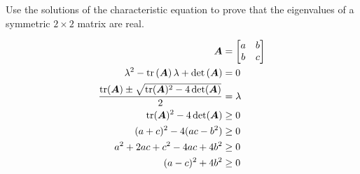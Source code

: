 Use the solutions of the characteristic equation to prove that the eigenvalues of a symmetric $2 \times 2$ matrix are real.

\begin{solution}
    \begin{align*}
        \boldsymbol{A} &= \begin{bmatrix}
            a & b \\
            b & c
        \end{bmatrix} \\
        \lambda^2 - \operatorname{tr}\left(\boldsymbol{A}\right)\lambda + \det\left(\boldsymbol{A}\right) &= 0 \\
        \frac{\operatorname{tr}(\boldsymbol{A}) \pm \sqrt{\operatorname{tr}(\boldsymbol{A})^2 - 4\det(\boldsymbol{A})}}{2} &= \lambda \\
        \operatorname{tr}(\boldsymbol{A})^2 - 4\det(\boldsymbol{A}) &\geq 0 \\
        (a+c)^2 - 4(ac-b^2) &\geq 0 \\
        a^2 + 2ac + c^2 - 4ac + 4b^2 &\geq 0 \\
        (a-c)^2 + 4b^2 &\geq 0
    \end{align*}
\end{solution}